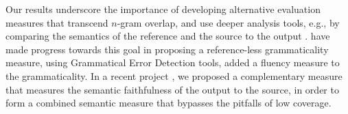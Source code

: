 \documentclass[11pt, a4paper]{article}
\begin{document}
Our results underscore the importance of developing alternative evaluation measures that transcend $n$-gram overlap, 
and use deeper analysis tools, e.g., by comparing
the semantics of the reference and the source to the output \cite[cf.][]{lo2011meant}.
have made progress towards this goal in proposing a reference-less grammaticality measure,
using Grammatical Error Detection tools,  added a fluency measure to the grammaticality.
In a recent project \cite{choshen2018usim}, we proposed a complementary measure that 
measures the semantic faithfulness of the output to the source, in order to form a combined semantic measure that bypasses the pitfalls of low coverage.


\end{document}
